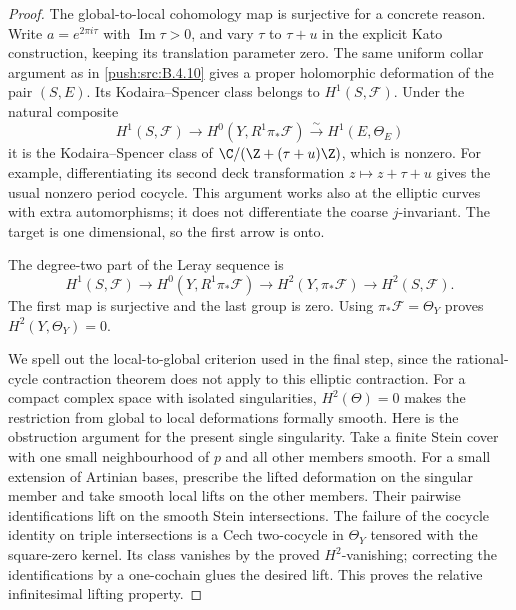 \begin{proof}
The global-to-local cohomology map is surjective for a concrete
reason.  Write $a=e^{2\pi i\tau}$ with $\operatorname{Im}\tau>0$,
and vary $\tau$ to $\tau+u$ in the explicit Kato construction,
keeping its translation parameter zero.
The same uniform collar argument as in \ref{push:src:B.4.10} gives a proper
holomorphic deformation of the pair $(S,E)$.
Its Kodaira--Spencer class belongs to $H^1(S,\mathcal F)$.
Under the natural composite
\[
 H^1(S,\mathcal F)\longrightarrow
 H^0(Y,R^1\pi_*\mathcal F)
 \xrightarrow{\ \sim\ }H^1(E,\Theta_E)
\]
it is the Kodaira--Spencer class of
$\C/(\Z+(\tau+u)\Z)$, which is nonzero.
For example, differentiating its second deck transformation
$z\mapsto z+\tau+u$ gives the usual nonzero period cocycle.
This argument works also at the elliptic curves with extra
automorphisms; it does not differentiate the coarse $j$-invariant.
The target is one dimensional, so the first arrow is onto.

The degree-two part of the Leray sequence is
\[
 H^1(S,\mathcal F)\longrightarrow
 H^0(Y,R^1\pi_*\mathcal F)\longrightarrow
 H^2(Y,\pi_*\mathcal F)\longrightarrow H^2(S,\mathcal F).
\]
The first map is surjective and the last group is zero.
Using $\pi_*\mathcal F=\Theta_Y$ proves
$H^2(Y,\Theta_Y)=0$.

We spell out the local-to-global criterion used in the final
step, since the rational-cycle contraction theorem does not
apply to this elliptic contraction.
For a compact complex space with isolated singularities,
$H^2(\Theta)=0$ makes the restriction from global to local
deformations formally smooth.
Here is the obstruction argument for the present single
singularity.  Take a finite Stein cover with one small
neighbourhood of $p$ and all other members smooth.
For a small extension of Artinian bases, prescribe the lifted
deformation on the singular member and take smooth local
lifts on the other members.  Their pairwise identifications
lift on the smooth Stein intersections.  The failure of the
cocycle identity on triple intersections is a Cech two-cocycle
in $\Theta_Y$ tensored with the square-zero kernel.
Its class vanishes by the proved $H^2$-vanishing; correcting
the identifications by a one-cochain glues the desired lift.
This proves the relative infinitesimal lifting property.


\end{proof}
